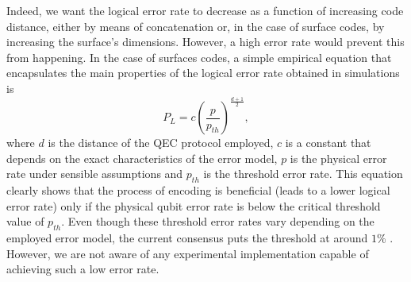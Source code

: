 Indeed, we want the logical error rate to decrease as a function of increasing
code distance, either by means of concatenation or, in the case of surface
codes, by increasing the surface's dimensions. However, a high error rate
would prevent this from happening. In the case of surfaces codes, a simple
empirical equation that encapsulates the main properties of the logical error
rate obtained in simulations is \cite{fowler12_surfac_codes}
\begin{equation}
  \label{eq:1}
  P_L = c\left(\frac{p}{p_{th}}\right)^{\frac{ d+1 }{2}},
\end{equation}
where $d$ is the distance of the QEC protocol employed, $c$ is a constant that
depends on the exact characteristics of the error model, $p$ is the physical
error rate under sensible assumptions and $p_{th}$ is the threshold error rate.
This equation clearly shows that the process of encoding is beneficial (leads to
a lower logical error rate) only if the physical qubit error rate is below the
critical threshold value of $p_{th}$. Even though these threshold error rates
vary depending on the employed error model, the current consensus puts the
threshold at around $1\%$ \cite{terhal15} \cite{Versluis_2017}. However, we are
not aware of any experimental implementation capable of achieving such a low
error rate.

